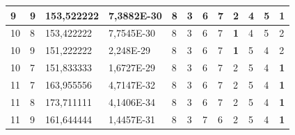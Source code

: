 \documentclass[conference]{IEEEtran}
\begin{document}
\begin{table}[]
\begin{tabular}{|llll|llllllll|}
		\multicolumn{1}{|l|}{9}   & \multicolumn{1}{l|}{9}         & \multicolumn{1}{l|}{153,522222}    & 7,3882E-30 & \multicolumn{1}{l|}{8}   & \multicolumn{1}{l|}{3}   & \multicolumn{1}{l|}{6}   & \multicolumn{1}{l|}{7}   & \multicolumn{1}{l|}{2}          & \multicolumn{1}{l|}{4}   & \multicolumn{1}{l|}{5}   & \textbf{1}             \\ \hline
		\multicolumn{1}{|l|}{10}  & \multicolumn{1}{l|}{8}         & \multicolumn{1}{l|}{153,422222}    & 7,7545E-30 & \multicolumn{1}{l|}{8}   & \multicolumn{1}{l|}{3}   & \multicolumn{1}{l|}{6}   & \multicolumn{1}{l|}{7}   & \multicolumn{1}{l|}{\textbf{1}} & \multicolumn{1}{l|}{4}   & \multicolumn{1}{l|}{5}   & 2                      \\ \hline
		\multicolumn{1}{|l|}{10}  & \multicolumn{1}{l|}{9}         & \multicolumn{1}{l|}{151,222222}    & 2,248E-29  & \multicolumn{1}{l|}{8}   & \multicolumn{1}{l|}{3}   & \multicolumn{1}{l|}{6}   & \multicolumn{1}{l|}{7}   & \multicolumn{1}{l|}{\textbf{1}} & \multicolumn{1}{l|}{5}   & \multicolumn{1}{l|}{4}   & 2                      \\ \hline
		\multicolumn{1}{|l|}{10}  & \multicolumn{1}{l|}{7}         & \multicolumn{1}{l|}{151,833333}    & 1,6727E-29 & \multicolumn{1}{l|}{8}   & \multicolumn{1}{l|}{3}   & \multicolumn{1}{l|}{6}   & \multicolumn{1}{l|}{7}   & \multicolumn{1}{l|}{2}          & \multicolumn{1}{l|}{5}   & \multicolumn{1}{l|}{4}   & \textbf{1}             \\ \hline
		\multicolumn{1}{|l|}{11}  & \multicolumn{1}{l|}{7}         & \multicolumn{1}{l|}{163,955556}    & 4,7147E-32 & \multicolumn{1}{l|}{8}   & \multicolumn{1}{l|}{3}   & \multicolumn{1}{l|}{6}   & \multicolumn{1}{l|}{7}   & \multicolumn{1}{l|}{2}          & \multicolumn{1}{l|}{5}   & \multicolumn{1}{l|}{4}   & \textbf{1}             \\ \hline
		\multicolumn{1}{|l|}{11}  & \multicolumn{1}{l|}{8}         & \multicolumn{1}{l|}{173,711111}    & 4,1406E-34 & \multicolumn{1}{l|}{8}   & \multicolumn{1}{l|}{3}   & \multicolumn{1}{l|}{6}   & \multicolumn{1}{l|}{7}   & \multicolumn{1}{l|}{2}          & \multicolumn{1}{l|}{5}   & \multicolumn{1}{l|}{4}   & \textbf{1}             \\ \hline
		\multicolumn{1}{|l|}{11}  & \multicolumn{1}{l|}{9}         & \multicolumn{1}{l|}{161,644444}    & 1,4457E-31 & \multicolumn{1}{l|}{8}   & \multicolumn{1}{l|}{3}   & \multicolumn{1}{l|}{7}   & \multicolumn{1}{l|}{6}   & \multicolumn{1}{l|}{2}          & \multicolumn{1}{l|}{5}   & \multicolumn{1}{l|}{4}   & \textbf{1}             \\ \hline

\end{tabular}
\end{table}
\end{document}
